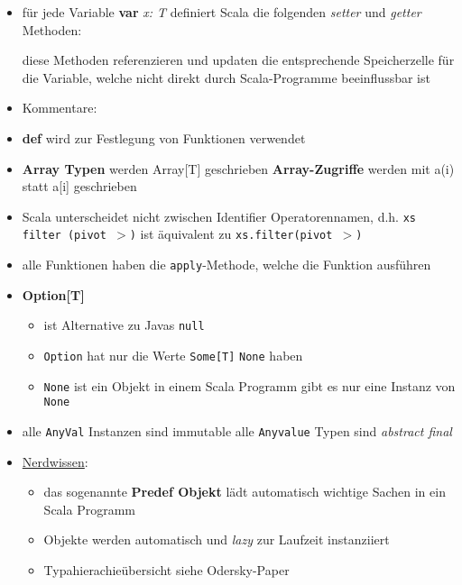 \begin{itemize}
  
  \item für jede Variable \textbf{var} \textit{x: T} definiert Scala
  die folgenden \textit{setter} und \textit{getter} Methoden:
  
  
  
  diese Methoden referenzieren und updaten die entsprechende Speicherzelle für
  die Variable, welche nicht direkt durch Scala-Programme beeinflussbar ist
  \item Kommentare:

  \item \textbf{def} wird zur Festlegung von Funktionen verwendet
  \item \textbf{Array Typen} werden Array[T] geschrieben \und 
  \textbf{Array-Zugriffe} werden mit a(i) statt a[i] geschrieben
  \item Scala unterscheidet nicht zwischen Identifier \und Operatorennamen,
  d.h. \texttt{xs filter (pivot $>$)} ist äquivalent zu 
  \texttt{xs.filter(pivot $>$)}
  \item alle Funktionen haben die \texttt{apply}-Methode, welche die 
  Funktion ausführen
  \item \textbf{Option[T]}
  \begin{itemize}
    \item ist Alternative zu Javas \texttt{null}
    \item \texttt{Option} hat nur die Werte \texttt{Some[T]} \oder 
    \texttt{None} haben
    \item \texttt{None} ist ein Objekt \und in einem Scala Programm gibt es
    nur eine Instanz von \texttt{None}
  \end{itemize}
  \item alle \texttt{AnyVal} Instanzen sind immutable \und alle 
  \texttt{Anyvalue} Typen sind \textit{abstract final}
  \item \uline{Nerdwissen}:
  \begin{itemize}
    \item das sogenannte \textbf{Predef Objekt} lädt automatisch
    wichtige Sachen in ein Scala Programm
    \item Objekte werden automatisch und \textit{lazy} zur Laufzeit
    instanziiert
    \item Typahierachieübersicht siehe Odersky-Paper
  \end{itemize}
  

\end{itemize}
